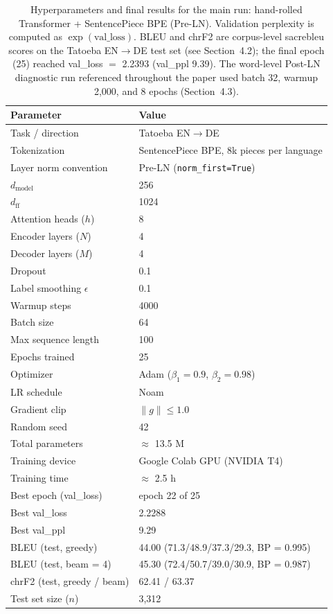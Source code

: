 \documentclass[10pt]{article}
\begin{document}
\begin{table}[htbp]
\centering
\begin{tabular}{ll}
\toprule
\textbf{Parameter} & \textbf{Value} \\
\midrule
Task / direction & Tatoeba EN$\rightarrow$DE \\
Tokenization & SentencePiece BPE, 8k pieces per language \\
Layer norm convention & Pre-LN (\texttt{norm\_first=True}) \\
$d_{\text{model}}$ & 256 \\
$d_{\text{ff}}$ & 1024 \\
Attention heads ($h$) & 8 \\
Encoder layers ($N$) & 4 \\
Decoder layers ($M$) & 4 \\
Dropout & 0.1 \\
Label smoothing $\epsilon$ & 0.1 \\
Warmup steps & 4000 \\
Batch size & 64 \\
Max sequence length & 100 \\
Epochs trained & 25 \\
Optimizer & Adam ($\beta_1=0.9$, $\beta_2=0.98$) \\
LR schedule & Noam \\
Gradient clip & $\lVert g \rVert \leq 1.0$ \\
Random seed & 42 \\
Total parameters & $\approx$ 13.5 M \\
Training device & Google Colab GPU (NVIDIA T4) \\
Training time & $\approx$ 2.5 h \\
Best epoch (val\_loss) & epoch 22 of 25 \\
Best val\_loss & 2.2288 \\
Best val\_ppl & 9.29 \\
BLEU (test, greedy) & 44.00 (71.3/48.9/37.3/29.3, BP = 0.995) \\
BLEU (test, beam = 4) & 45.30 (72.4/50.7/39.0/30.9, BP = 0.987) \\
chrF2 (test, greedy / beam) & 62.41 / 63.37 \\
Test set size ($n$) & 3,312 \\
\bottomrule
\end{tabular}
\caption{Hyperparameters and final results for the main run: hand-rolled Transformer + SentencePiece BPE (Pre-LN). Validation perplexity is computed as $\exp(\text{val\_loss})$. BLEU and chrF2 are corpus-level sacrebleu scores on the Tatoeba EN$\rightarrow$DE test set (see Section~4.2); the final epoch (25) reached val\_loss $=$ 2.2393 (val\_ppl 9.39). The word-level Post-LN diagnostic run referenced throughout the paper used batch 32, warmup 2{,}000, and 8 epochs (Section~4.3).}
\label{tab:hparams}
\end{table}
\end{document}

